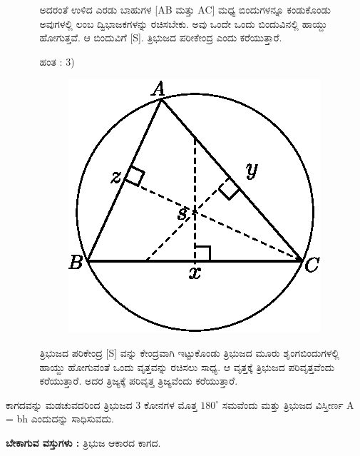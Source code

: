 \begin{enumerate}
\begin{itemize}
 
 ಅದರಂತೆ ಉಳಿದ ಎರಡು ಬಾಹುಗಳ [AB ಮತ್ತು  AC] ಮಧ್ಯ ಬಿಂದುಗಳನ್ನೂ ಕಂಡುಕೊಂಡು ಅವುಗಳಲ್ಲಿ ಲಂಬ ದ್ವಿಭಾಜಕಗಳನ್ನು ರಚಿಸಬೇಕು. ಅವು ಒಂದೇ ಒಂದು ಬಿಂದುವಿನಲ್ಲಿ ಹಾಯ್ದು ಹೋಗುತ್ತವೆ. ಆ ಬಿಂದುವಿಗೆ  [S]. ತ್ರಿಭುಜದ ಪರೀಕೇಂದ್ರ ಎಂದು ಕರೆಯುತ್ತಾರೆ. 
 
 
 \item[ಹಂತ : 3)] 
 ~
 \begin{figure}[H]
\centering
\includegraphics[scale=.8]{src/figure/chap1/fig1-38c.eps}
\end{figure}
   ತ್ರಿಭುಜದ ಪರಿಕೇಂದ್ರ [S] ವನ್ನು ಕೇಂದ್ರವಾಗಿ ಇಟ್ಟುಕೊಂಡು ತ್ರಿಭುಜದ ಮೂರು ಶೃಂಗಬಿಂದುಗಳಲ್ಲಿ ಹಾಯ್ದು ಹೋಗುವಂತೆ ಒಂದು ವೃತ್ತವನ್ನು ರಚಿಸಲು ಸಾಧ್ಯ. ಆ ವೃತ್ತಕ್ಕೆ ತ್ರಿಭುಜದ ಪರಿವೃತ್ತವೆಂದು ಕರೆಯುತ್ತಾರೆ. ಅದರ  ತ್ರಿಜ್ಯಕ್ಕೆ ಪರಿವೃತ್ತ  ತ್ರಿಜ್ಯವೆಂದು ಕರೆಯುತ್ತಾರೆ. 
  \end{itemize}
 \end{enumerate}

\noindent
ಕಾಗದವನ್ನು ಮಡಚುವದರಿಂದ ತ್ರಿಭುಜದ 3 ಕೋನಗಳ ಮೊತ್ತ $180^\circ$ ಸಮವೆಂದು ಮತ್ತು ತ್ರಿಭುಜದ ವಿಸ್ತೀರ್ಣ  A = bh ಎಂದುದನ್ನು ಸಾಧಿಸುವದು. 

\noindent
\textbf{ಬೇಕಾಗುವ ವಸ್ತುಗಳು :} ತ್ರಿಭುಜ ಆಕಾರದ ಕಾಗದ. 

